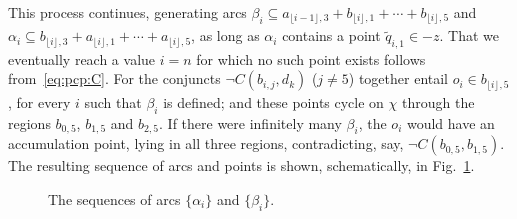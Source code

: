 \documentclass{article}
\newcommand{\set}[1]{\{#1\}}
\newcommand{\md}[2][] {{\lfloor#2\rfloor_{#1}}}
\begin{document}
This process continues, generating arcs $\beta_i \subseteq
a_{\md{i-1},3} + b_{\md{i},1} + \cdots + b_{\md{i},5}$ and $\alpha_i
\subseteq b_{\md{i},3} + a_{\md{i},1} + \cdots + a_{\md{i},5}$, as
long as $\alpha_i$ contains a point $\tilde{q}_{i,1} \in -z$. That we
eventually reach a value $i = n$ for which no such point exists
follows from~\eqref{eq:pcp:C}. For the conjuncts $\neg C(b_{i,j},
d_k)$ ($j \neq 5$) together entail $o_i \in b_{\md{i},5}$, for every
$i$ such that $\beta_i$ is defined; and these points cycle on $\chi$
through the regions $b_{0,5}$, $b_{1,5}$ and $b_{2,5}$. If there were
infinitely many $\beta_i$, the $o_i$ would have an accumulation point,
lying in all three regions, contradicting, say, $\neg
C(b_{0,5},b_{1,5})$.  The resulting sequence of arcs and points is
shown, schematically, in Fig.~\ref{fig:arcs2}.
\begin{figure}
\caption{The sequences of arcs $\set{\alpha_i}$ and $\set{\beta_i}$.}
\label{fig:arcs2}
\end{figure}
\end{document}
